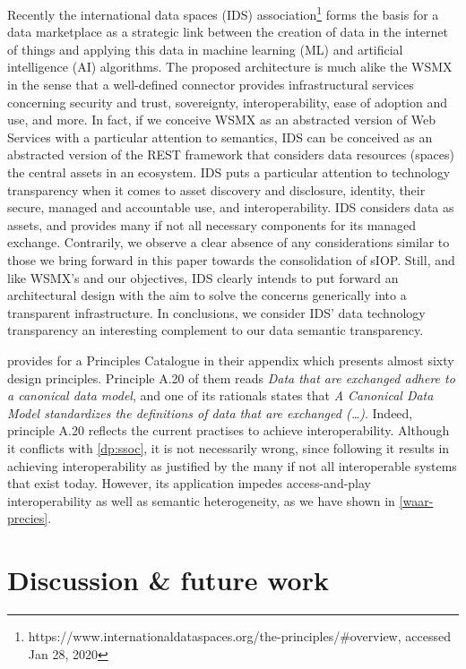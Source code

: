 \documentclass[sort&compress,preprint,authoryear,3p,twocolumn]{elsarticle}
\begin{document}
Recently the international data spaces (IDS) association\footnote{https://www.internationaldataspaces.org/the-principles/\#overview,
  accessed Jan 28, 2020} forms the basis for a data marketplace as a
strategic link between the creation of data in the internet of things
and applying this data in machine learning (ML) and artificial
intelligence (AI) algorithms. The proposed architecture is much alike
the WSMX in the sense that a well-defined connector provides
infrastructural services concerning security and trust, sovereignty,
interoperability, ease of adoption and use, and more. In fact, if we
conceive WSMX as an abstracted version of Web Services with a particular
attention to semantics, IDS can be conceived as an abstracted version of
the REST framework that considers data resources (spaces) the central
assets in an ecosystem. IDS puts a particular attention to technology
transparency when it comes to asset discovery and disclosure, identity,
their secure, managed and accountable use, and interoperability. IDS
considers data as assets, and provides many if not all necessary
components for its managed exchange. Contrarily, we observe a clear
absence of any considerations similar to those we bring forward in this
paper towards the consolidation of sIOP. Still, and like WSMX's and our
objectives, IDS clearly intends to put forward an architectural design
with the aim to solve the concerns generically into a transparent
infrastructure. In conclusions, we consider IDS' data technology
transparency an interesting complement to our data semantic
transparency.

\citep{Greefhorst2011} provides for a Principles Catalogue in their
appendix which presents almost sixty design principles. Principle A.20
of them reads \emph{Data that are exchanged adhere to a canonical data
model}, and one of its rationals states that \emph{A Canonical Data
Model standardizes the definitions of data that are exchanged (\ldots)}.
Indeed, principle A.20 reflects the current practises to achieve
interoperability. Although it conflicts with \cref{dp:ssoc}, it is not
necessarily wrong, since following it results in achieving
interoperability as justified by the many if not all interoperable
systems that exist today. However, its application impedes
access-and-play interoperability as well as semantic heterogeneity, as
we have shown in \cref{waar-precies}.

\hypertarget{discussion-future-work}{%
\section{Discussion \& future work}\label{discussion-future-work}}
\end{document}

